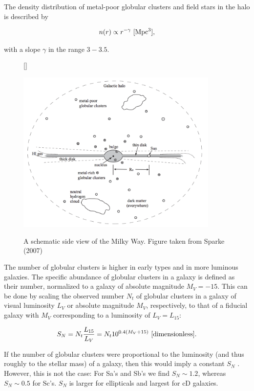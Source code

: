 \documentclass[a4paper,10pt]{article}
\begin{document}
{\noindent}The density distribution of metal-poor globular clusters and field stars in the halo is described by

\begin{align*}
    n(r)\propto r^{-\gamma} ~ [{\rm Mpc^3}],
\end{align*}

{\noindent}with a slope $\gamma$ in the range $3-3.5$.

\begin{figure}[t]
    [\FBwidth]
    {\caption{\footnotesize{A schematic side view of the Milky Way. Figure taken from Sparke (2007)}}
    \label{fig:mwgschematic}}
    {\includegraphics[width=10cm]{figures/MWGschematic.png}}
\end{figure}

{\noindent}The number of globular clusters is higher in early types and in more luminous galaxies. The specific abundance of globular clusters in a galaxy is defined as their number, normalized to a galaxy of absolute magnitude $M_V=-15$. This can be done by scaling the observed number $N_t$ of globular clusters in a galaxy of visual luminosity $L_V$ or absolute magnitude $M_V$, respectively, to that of a fiducial galaxy with $M_V$ corresponding to a luminosity of $L_V=L_{15}$:

\begin{align*}
    S_N = N_t\frac{L_{15}}{L_V} = N_t10^{0.4(M_V+15)} ~ [{\rm dimensionless}].
\end{align*}

{\noindent}If the number of globular clusters were proportional to the luminosity (and thus roughly to the stellar mass) of a galaxy, then this would imply a constant $S_N$ . However, this is not the case: For Sa's and Sb's we find $S_N\sim1.2$, whereas $S_N\sim0.5$ for Sc's. $S_N$ is larger for ellipticals and largest for cD galaxies.
\end{document}
